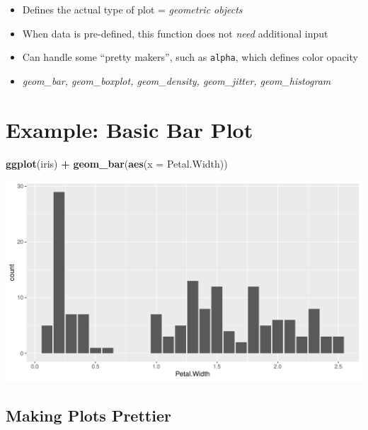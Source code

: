 \documentclass[
]{book}
\newenvironment{Shaded}{\begin{snugshade}}{\end{snugshade}}
\newcommand{\AttributeTok}[1]{\textcolor[rgb]{0.13,0.29,0.53}{#1}}
\newcommand{\FunctionTok}[1]{\textcolor[rgb]{0.13,0.29,0.53}{\textbf{#1}}}
\newcommand{\NormalTok}[1]{#1}
\newcommand{\SpecialCharTok}[1]{\textcolor[rgb]{0.81,0.36,0.00}{\textbf{#1}}}
\providecommand{\tightlist}{%
  \setlength{\itemsep}{0pt}\setlength{\parskip}{0pt}}
\begin{document}
\begin{itemize}
\tightlist
\item
  Defines the actual type of plot = \emph{geometric objects}
\item
  When data is pre-defined, this function does not \emph{need} additional input
\item
  Can handle some ``pretty makers'', such as \texttt{alpha}, which defines color opacity
\item
  \emph{geom\_bar, geom\_boxplot, geom\_density, geom\_jitter, geom\_histogram}
\end{itemize}

\section{Example: Basic Bar Plot}\label{example-basic-bar-plot}

\begin{Shaded}
\begin{Highlighting}[]
\FunctionTok{ggplot}\NormalTok{(iris) }\SpecialCharTok{+} 
  \FunctionTok{geom\_bar}\NormalTok{(}\FunctionTok{aes}\NormalTok{(}\AttributeTok{x =}\NormalTok{ Petal.Width)) }
\end{Highlighting}
\end{Shaded}

\begin{flushleft}\includegraphics{_main_files/figure-latex/unnamed-chunk-48-1} \end{flushleft}

\subsection{Making Plots Prettier}\label{making-plots-prettier}
\end{document}
